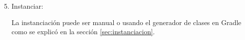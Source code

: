 			

\begin{enumerate}
  \setcounter{enumi}{4}
	\item Instanciar:

	La instanciación puede ser manual o usando el generador de clases en Gradle como se explicó en la sección \ref{sec:instanciacion}.

\end{enumerate}	






